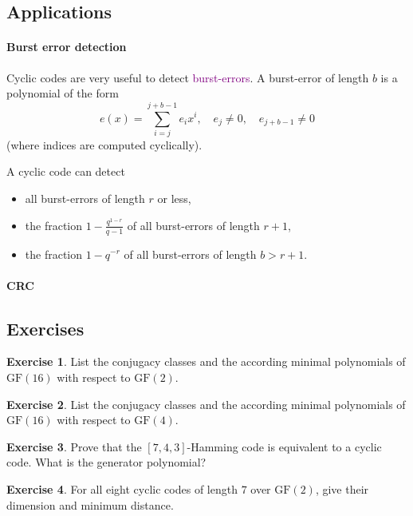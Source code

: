 \documentclass[a4paper, 11pt, openany]{book}
\numberwithin{equation}{section}
\theoremstyle{plain}
\theoremstyle{definition}
\newtheorem{exercise}   {Exercise}  [section]
\newcommand{\GF}{\mathrm{GF}}
\newcommand{\Define}[1]{\textcolor{purple}{#1}}
\begin{document}
\subsection{Applications}

\paragraph{Burst error detection}
Cyclic codes are very useful to detect \Define{burst-errors}. A burst-error of length $b$ is a polynomial of the form 
$$
	e(x) = \sum_{i=j}^{j + b - 1} e_i x^i, \quad e_j \ne 0, \quad e_{j+b-1} \ne 0
$$
(where indices are computed cyclically).

A cyclic code can detect
\begin{itemize}
	\item all burst-errors of length $r$ or less,
	
	\item the fraction $1 - \frac{q^{1-r}}{q-1}$ of all burst-errors of length $r+1$,
	
	\item the fraction $1 - q^{-r}$ of all burst-errors of length $b > r+1$.
\end{itemize}


\paragraph{CRC}



\subsection{Exercises}


\begin{exercise}
List the conjugacy classes and the according minimal polynomials of $\GF(16)$ with respect to $\GF(2)$.
\end{exercise}


\begin{exercise}
List the conjugacy classes and the according minimal polynomials of $\GF(16)$ with respect to $\GF(4)$.
\end{exercise}


\begin{exercise}
Prove that the $[7,4,3]$-Hamming code is equivalent to a cyclic code. What is the generator polynomial?
\end{exercise}




\begin{exercise}
For all eight cyclic codes of length $7$ over $\GF(2)$, give their dimension and minimum distance.
\end{exercise}
\end{document}
